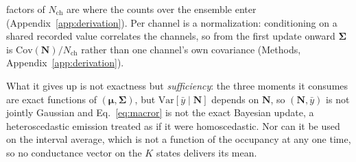 factors of $N_{\mathrm{ch}}$ are where the counts over the ensemble enter
(Appendix~\ref{app:derivation}).
Per channel is a normalization:
conditioning on a shared recorded value correlates the channels, so from the first update onward
$\bm{\Sigma}$ is $\mathrm{Cov}(\mathbf{N})/N_{\mathrm{ch}}$ rather than one channel's own
covariance (Methods, Appendix~\ref{app:derivation}).

What it gives up is not exactness but \emph{sufficiency}: the three moments it consumes are exact
functions of $(\bm{\mu},\bm{\Sigma})$, but $\mathrm{Var}[\bar y\mid\mathbf{N}]$ depends on
$\mathbf{N}$, so $(\mathbf{N},\bar y)$ is not jointly Gaussian and Eq.~\ref{eq:macror} is not the
exact Bayesian update, a heteroscedastic emission treated as if it were homoscedastic. Nor can it
be used on the interval average, which is not a function of the occupancy at any one time, so no
conductance vector on the $K$ states delivers its mean.

